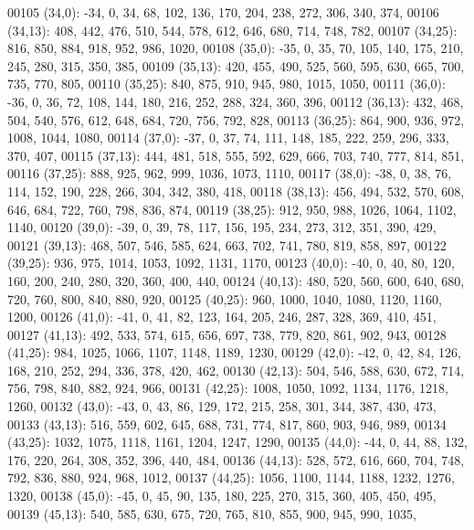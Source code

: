 \begin{DoxyCode}
00105       (34,0): -34, 0, 34, 68, 102, 136, 170, 204, 238, 272, 306, 340, 374,
00106       (34,13): 408, 442, 476, 510, 544, 578, 612, 646, 680, 714, 748, 782,
00107       (34,25): 816, 850, 884, 918, 952, 986, 1020,
00108       (35,0): -35, 0, 35, 70, 105, 140, 175, 210, 245, 280, 315, 350, 385,
00109       (35,13): 420, 455, 490, 525, 560, 595, 630, 665, 700, 735, 770, 805,
00110       (35,25): 840, 875, 910, 945, 980, 1015, 1050,
00111       (36,0): -36, 0, 36, 72, 108, 144, 180, 216, 252, 288, 324, 360, 396,
00112       (36,13): 432, 468, 504, 540, 576, 612, 648, 684, 720, 756, 792, 828,
00113       (36,25): 864, 900, 936, 972, 1008, 1044, 1080,
00114       (37,0): -37, 0, 37, 74, 111, 148, 185, 222, 259, 296, 333, 370, 407,
00115       (37,13): 444, 481, 518, 555, 592, 629, 666, 703, 740, 777, 814, 851,
00116       (37,25): 888, 925, 962, 999, 1036, 1073, 1110,
00117       (38,0): -38, 0, 38, 76, 114, 152, 190, 228, 266, 304, 342, 380, 418,
00118       (38,13): 456, 494, 532, 570, 608, 646, 684, 722, 760, 798, 836, 874,
00119       (38,25): 912, 950, 988, 1026, 1064, 1102, 1140,
00120       (39,0): -39, 0, 39, 78, 117, 156, 195, 234, 273, 312, 351, 390, 429,
00121       (39,13): 468, 507, 546, 585, 624, 663, 702, 741, 780, 819, 858, 897,
00122       (39,25): 936, 975, 1014, 1053, 1092, 1131, 1170,
00123       (40,0): -40, 0, 40, 80, 120, 160, 200, 240, 280, 320, 360, 400, 440,
00124       (40,13): 480, 520, 560, 600, 640, 680, 720, 760, 800, 840, 880, 920,
00125       (40,25): 960, 1000, 1040, 1080, 1120, 1160, 1200,
00126       (41,0): -41, 0, 41, 82, 123, 164, 205, 246, 287, 328, 369, 410, 451,
00127       (41,13): 492, 533, 574, 615, 656, 697, 738, 779, 820, 861, 902, 943,
00128       (41,25): 984, 1025, 1066, 1107, 1148, 1189, 1230,
00129       (42,0): -42, 0, 42, 84, 126, 168, 210, 252, 294, 336, 378, 420, 462,
00130       (42,13): 504, 546, 588, 630, 672, 714, 756, 798, 840, 882, 924, 966,
00131       (42,25): 1008, 1050, 1092, 1134, 1176, 1218, 1260,
00132       (43,0): -43, 0, 43, 86, 129, 172, 215, 258, 301, 344, 387, 430, 473,
00133       (43,13): 516, 559, 602, 645, 688, 731, 774, 817, 860, 903, 946, 989,
00134       (43,25): 1032, 1075, 1118, 1161, 1204, 1247, 1290,
00135       (44,0): -44, 0, 44, 88, 132, 176, 220, 264, 308, 352, 396, 440, 484,
00136       (44,13): 528, 572, 616, 660, 704, 748, 792, 836, 880, 924, 968, 1012,
00137       (44,25): 1056, 1100, 1144, 1188, 1232, 1276, 1320,
00138       (45,0): -45, 0, 45, 90, 135, 180, 225, 270, 315, 360, 405, 450, 495,
00139       (45,13): 540, 585, 630, 675, 720, 765, 810, 855, 900, 945, 990, 1035,

\end{DoxyCode}
